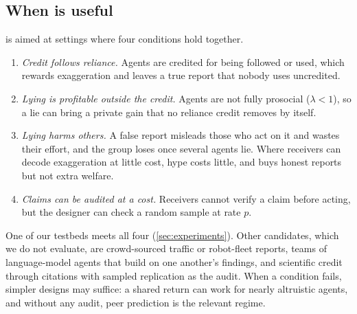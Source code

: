 
\subsection{When \tvc{} is useful}
\label{sec:when}

\tvc{} is aimed at settings where four conditions hold together.
\begin{enumerate}
  \item \emph{Credit follows reliance.} Agents are credited for being followed or used, which rewards exaggeration and leaves a true report that nobody uses uncredited.
  \item \emph{Lying is profitable outside the credit.} Agents are not fully prosocial ($\lambda<1$), so a lie can bring a private gain that no reliance credit removes by itself.
  \item \emph{Lying harms others.} A false report misleads those who act on it and wastes their effort, and the group loses once several agents lie. Where receivers can decode exaggeration at little cost, hype costs little, and \tvc{} buys honest reports but not extra welfare.
  \item \emph{Claims can be audited at a cost.} Receivers cannot verify a claim before acting, but the designer can check a random sample at rate $p$.
\end{enumerate}
One of our testbeds meets all four (\cref{sec:experiments}). Other candidates, which we do not evaluate, are crowd-sourced traffic or robot-fleet reports, teams of language-model agents that build on one another's findings, and scientific credit through citations with sampled replication as the audit. When a condition fails, simpler designs may suffice: a shared return can work for nearly altruistic agents, and without any audit, peer prediction is the relevant regime.



